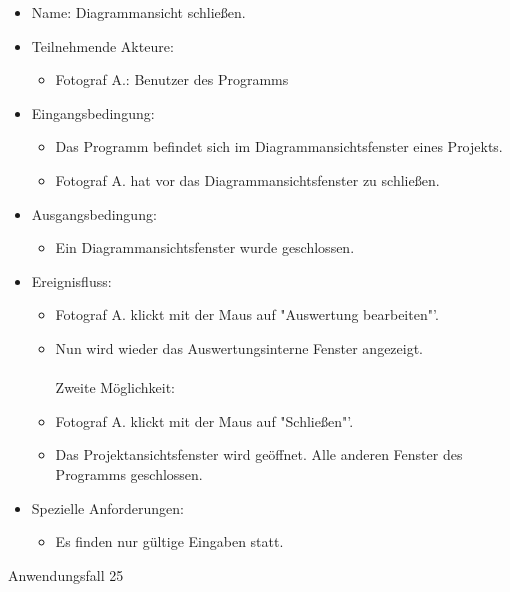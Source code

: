 \begin{itemize}
\begin{itemize}
\item Name: Diagrammansicht schließen.
\item Teilnehmende Akteure:
\begin{itemize}
\item Fotograf A.: Benutzer des Programms
\end{itemize}
\item Eingangsbedingung:
\begin{itemize}
\item Das Programm befindet sich im Diagrammansichtsfenster eines Projekts.
\item Fotograf A. hat vor das Diagrammansichtsfenster zu schließen.
\end{itemize}
\item Ausgangsbedingung:
\begin{itemize}
\item Ein Diagrammansichtsfenster wurde geschlossen.
\end{itemize}
\item Ereignisfluss:
\begin{itemize}
\\Erste Möglichkeit:\\
\item Fotograf A. klickt mit der Maus auf "Auswertung bearbeiten"'.
\item Nun wird wieder das Auswertungsinterne Fenster angezeigt.\\\\Zweite Möglichkeit:\\
\item Fotograf A. klickt mit der Maus auf "Schließen"'.
\item Das Projektansichtsfenster wird geöffnet. Alle anderen Fenster des Programms geschlossen.
\end{itemize}
\item Spezielle Anforderungen:
\begin{itemize}
\item Es finden nur gültige Eingaben statt.
\end{itemize}
\end{itemize}

\begin{description}
\item[Anwendungsfall 25]
\end{description}
 

\end{itemize}
